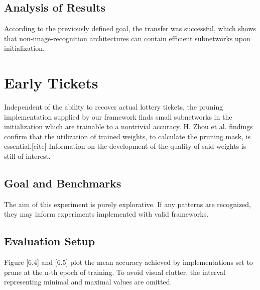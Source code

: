 \subsection*{Analysis of Results}
According to the previously defined goal, the transfer was successful, which shows that non-image-recognition architectures can contain efficient subnetworks upon initialization.


\section{Early Tickets}
Independent of the ability to recover actual lottery tickets, the pruning implementation supplied by our framework finds small subnetworks in the initialization which are trainable to a nontrivial accuracy. H. Zhou et al. findings confirm that the utilization of trained weights, to calculate the pruning mask, is essential.[cite] Information on the development of the quality of said weights is still of interest. 
\subsection*{Goal and Benchmarks}
The aim of this experiment is purely explorative. If any patterns are recognized, they may inform experiments implemented with valid frameworks.
\subsection*{Evaluation Setup}
Figure [6.4] and [6.5] plot the mean accuracy achieved by implementations set to prune at the n-th epoch of training. To avoid visual clutter, the interval representing minimal and maximal values are omitted. 
